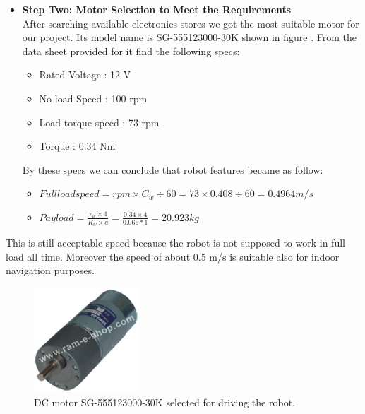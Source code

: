 \documentclass[12pt]{article}
\begin{document}
\begin{itemize}
	\item \textbf{Step Two: Motor Selection to Meet the Requirements}\\
	After searching available electronics stores we got the most suitable motor for our project. Its model name is SG-555123000-30K shown in figure . From the data sheet provided for it find the following specs:\cite{204}
	\begin{itemize}
		\item Rated Voltage : 12 V
		\item No load Speed : 100 rpm
		\item Load torque speed : 73 rpm
		\item Torque : 0.34 Nm
	\end{itemize}
	By these specs we can conclude that robot features became as follow:
	\begin{itemize}
		\item ${Full  load  speed = rpm \times C_w \div 60 = 73 \times 0.408 \div 60 = 0.4964 m/s}$
		\item ${Pay load = \frac{ \tau_w \times 4}{ R_w \times a} = \frac{0.34 \times 4}{0.065 * 1} = 20.923 kg}$
		
	\end{itemize}
\end{itemize}

This is still acceptable speed because the robot is not supposed to work in full load all time. Moreover the speed of about 0.5 m/s is suitable also for indoor navigation purposes.

\begin{figure}[H]
	\centering
	\includegraphics[width =0.35\textwidth]{Fig/dc-motor.jpg}
	\caption{DC motor SG-555123000-30K selected for driving the robot.}
	\label{fig:dc-motor}
\end{figure}



\newpage
\end{document}
